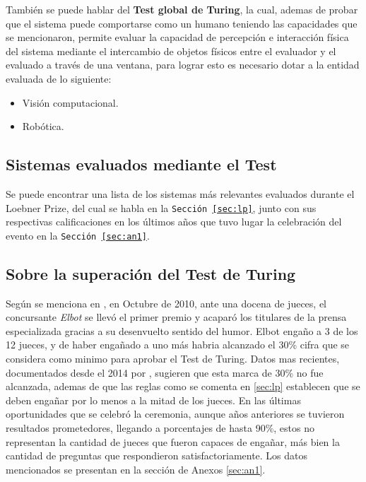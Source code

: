 \documentclass{article}
\begin{document}
Tambi\'en se puede hablar del \textbf{Test global de Turing}, la cual, ademas de probar que el sistema puede comportarse como un humano teniendo las capacidades que se mencionaron, permite evaluar la capacidad de percepci\'on e interacci\'on f\'isica del sistema mediante el intercambio de objetos f\'isicos entre el evaluador y el evaluado a trav\'es de una ventana, para lograr esto es necesario dotar a la entidad evaluada de lo siguiente:

\begin{itemize}
\item Visi\'on computacional.
\item Rob\'otica.
\end{itemize}



\subsection{Sistemas evaluados mediante el Test}
Se puede encontrar una lista de los sistemas m\'as relevantes evaluados durante el Loebner Prize, del cual se habla en la  \texttt{Secci\'on \ref{sec:lp}}, junto con sus respectivas calificaciones en los \'ultimos a\~nos que tuvo lugar la celebraci\'on del evento en la \texttt{Secci\'on \ref{sec:an1}}.


\subsection{Sobre la superaci\'on del Test de Turing}
Seg\'un se menciona en \cite{loebner2}, en Octubre de 2010, ante una docena de jueces, el concursante \textit{Elbot} se llev\'o el primer premio y acapar\'o los titulares de la prensa especializada gracias a su desenvuelto sentido del humor. Elbot enga\~no a 3 de los 12 jueces, y de haber enga\~nado a uno m\'as habria alcanzado el 30\% cifra que se considera como minimo para aprobar el Test de Turing.
Datos mas recientes, documentados desde el 2014 por \cite{loebner1}, sugieren que esta marca de 30\% no fue alcanzada, ademas de que las reglas como se comenta en \ref{sec:lp} establecen que se deben enga\~nar por lo menos a la mitad de los jueces. En las \'ultimas oportunidades que se celebr\'o la ceremonia, aunque a\~nos anteriores se tuvieron resultados prometedores, llegando a porcentajes de hasta 90\%, estos no representan la cantidad de jueces que fueron capaces de enga\~nar, m\'as bien la cantidad de preguntas que respondieron satisfactoriamente. Los datos mencionados se presentan en la secci\'on de Anexos \ref{sec:an1}.
\end{document}
